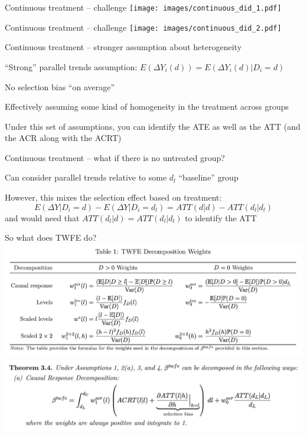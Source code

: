 \documentclass[notes,11pt, aspectratio=169]{beamer}
\newenvironment{wideitemize}{\itemize\addtolength{\itemsep}{10pt}}{\enditemize}
\begin{document}
\begin{frame}{Continuous treatment -- challenge}
  \texttt{[image: images/continuous\_did\_1.pdf]}
\end{frame}

\begin{frame}{Continuous treatment -- challenge}
  \texttt{[image: images/continuous\_did\_2.pdf]}
\end{frame}

\begin{frame}{Continuous treatment -- stronger assumption about heterogeneity}
  \begin{wideitemize}
  \item ``Strong'' parallel trends assumption: $E(\Delta Y_{i}(d)) = E(\Delta Y_{i}(d) | D_{i} = d)$
  \item No selection bias ``on average''
  \item Effectively assuming some kind of homogeneity in the treatment across groups
  \item Under this set of assumptions, you can identify the ATE as well as the ATT (and the ACR along with the ACRT)
  \end{wideitemize}
\end{frame}


\begin{frame}{Continuous treatment -- what if there is no untreated group?}
  \begin{wideitemize}
  \item Can consider parallel trends relative to some $d_{l}$ ``baseline'' group 
  \item However, this mixes the selection effect based on treatment:
\begin{equation}
  E(\Delta Y | D_{i} = d) - E(\Delta Y | D_{i} = d_{l}) = ATT(d | d) - ATT(d_{l} | d_{l})
\end{equation}
and would need that $ATT(d_l|d) = ATT(d_{l}| d_{l})$ to identify the ATT
  \end{wideitemize}
\end{frame}

\begin{frame}{So what does TWFE do?}
  \includegraphics[width=0.8\linewidth]{images/twfe_continuous_did_weights.png}
  \includegraphics[width=0.8\linewidth]{images/twfe_continuous_did_formula1.png}
  
\end{frame}
\end{document}
